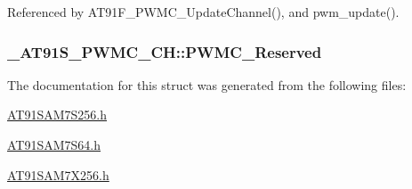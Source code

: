 Referenced by AT91F\_\-PWMC\_\-UpdateChannel(), and pwm\_\-update().\hypertarget{struct__AT91S__PWMC__CH_da98ecbec7cd83bce1e5ec85c25a463d}{
\subsubsection{ {\bf \_\-AT91S\_\-PWMC\_\-CH::PWMC\_\-Reserved}}}
\label{struct__AT91S__PWMC__CH_da98ecbec7cd83bce1e5ec85c25a463d}




The documentation for this struct was generated from the following files:\begin{CompactItemize}
\item 
\hyperlink{AT91SAM7S256_8h}{AT91SAM7S256.h}\item 
\hyperlink{AT91SAM7S64_8h}{AT91SAM7S64.h}\item 
\hyperlink{AT91SAM7X256_8h}{AT91SAM7X256.h}\end{CompactItemize}
